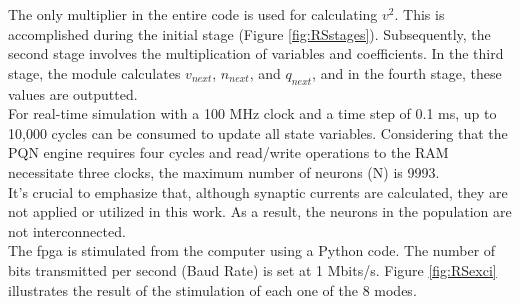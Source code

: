 The only multiplier in the entire code is used for calculating $v^2$. This is accomplished during the initial stage (Figure \ref{fig:RSstages}). 
Subsequently, the second stage involves the multiplication of variables and coefficients. In the third stage, the module calculates \(v_{next}\), \(n_{next}\),
 and \(q_{next}\), and in the fourth stage, these values are outputted.\\
For real-time simulation with a 100 MHz clock and a time step of 0.1 ms, up to 10,000 cycles 
can be consumed to update all state variables. Considering that the PQN engine requires four cycles 
and read/write operations to the RAM necessitate three clocks, the maximum number of neurons (N) is 9993.\\
It's crucial to emphasize that, although synaptic currents are calculated, they are not applied or utilized in this work.
As a result, the neurons in the population are not interconnected.\\

The \acrshort{fpga} is stimulated from the computer using a Python code. 
The number of bits transmitted per second (Baud Rate) is set at 1 Mbits/s. 
Figure \ref{fig:RSexci} illustrates the result of the stimulation of each one of the 8 modes.\\

